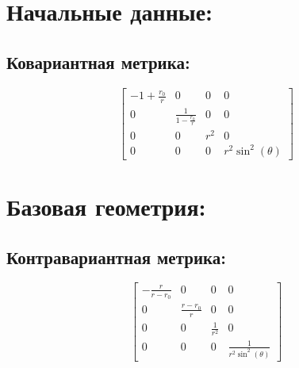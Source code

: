 \documentclass[a4paper, 10pt]{article}
\begin{document}
\section{Начальные данные:}
\subsection{Ковариантная метрика:}
$$\left[\begin{matrix}-1 + \frac{r_{0}}{r} & 0 & 0 & 0\\0 & \frac{1}{1 - \frac{r_{0}}{r}} & 0 & 0\\0 & 0 & r^{2} & 0\\0 & 0 & 0 & r^{2} \sin^{2}{\left(\theta \right)}\end{matrix}\right]$$
\section{Базовая геометрия:}
\subsection{Контравариантная метрика:}
$$\left[\begin{matrix}- \frac{r}{r - r_{0}} & 0 & 0 & 0\\0 & \frac{r - r_{0}}{r} & 0 & 0\\0 & 0 & \frac{1}{r^{2}} & 0\\0 & 0 & 0 & \frac{1}{r^{2} \sin^{2}{\left(\theta \right)}}\end{matrix}\right]$$
\end{document}
